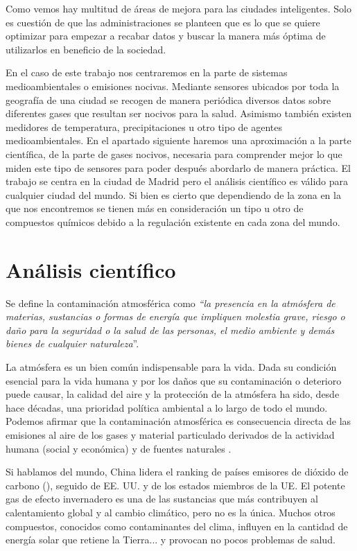 Como vemos hay multitud de áreas de mejora para las ciudades inteligentes. Solo es cuestión de que las administraciones se planteen que es lo que se quiere optimizar para empezar a recabar datos y buscar la manera más óptima de utilizarlos en beneficio de la sociedad. 

En el caso de este trabajo nos centraremos en la parte de sistemas medioambientales o emisiones nocivas. Mediante sensores ubicados por toda la geografía de una ciudad se recogen de manera periódica diversos datos sobre diferentes gases que resultan ser nocivos para la salud. Asimismo también existen medidores de temperatura, precipitaciones u otro tipo de agentes medioambientales. En el apartado siguiente haremos una aproximación a la parte científica, de la parte de gases nocivos, necesaria para comprender mejor lo que miden este tipo de sensores para poder después abordarlo de manera práctica. El trabajo se centra en la ciudad de Madrid pero el análisis científico es válido para cualquier ciudad del mundo. Si bien es cierto que dependiendo de la zona en la que nos encontremos se tienen más en consideración un tipo u otro de compuestos químicos debido a la regulación existente en cada zona del mundo.


\section{Análisis científico}\label{teorico-cientifico}

Se define la contaminación atmosférica como \textit{“la presencia en la atmósfera de materias, sustancias o formas de energía que impliquen molestia grave, riesgo o daño para la seguridad o la salud de las personas, el medio ambiente y demás bienes de cualquier naturaleza}”.

La atmósfera es un bien común indispensable para la vida. Dada su condición esencial para la vida humana y por los daños que su contaminación o deterioro puede causar, la calidad del aire y la protección de la atmósfera ha sido, desde hace décadas, una prioridad política ambiental a lo largo de todo el mundo. Podemos afirmar que la contaminación atmosférica es consecuencia directa de las emisiones al aire de los gases y material particulado derivados de la actividad humana (social y económica) y de fuentes naturales \cite{informe_2018}.

Si hablamos del mundo, China lidera el ranking de países emisores de dióxido de carbono (), seguido de EE. UU. y de los estados miembros de la UE. El potente gas de efecto invernadero es una de las sustancias que más contribuyen al calentamiento global y al cambio climático, pero no es la única. Muchos otros compuestos, conocidos como contaminantes del clima, influyen en la cantidad de energía solar que retiene la Tierra... y provocan no pocos problemas de salud.

